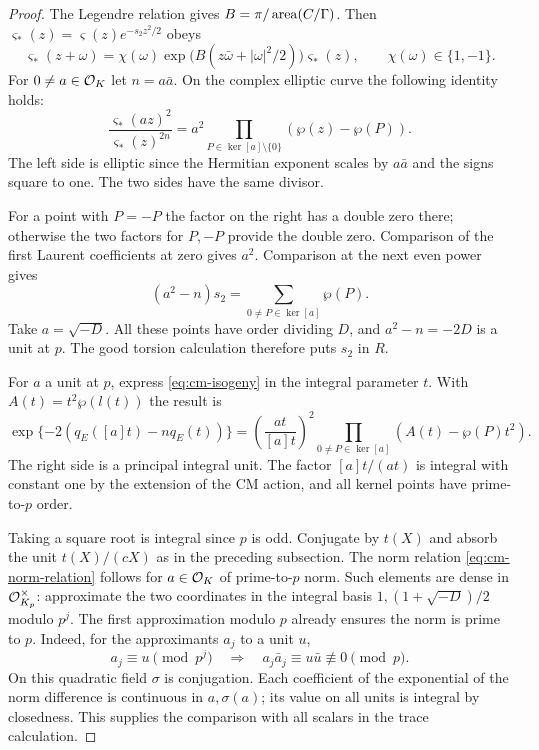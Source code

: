 \begin{proof}

The Legendre relation gives
\(B=\pi/\operatorname{area}(C/\Gamma)\).
Then \(\varsigma_*(z)=\varsigma(z)e^{-s_2z^2/2}\) obeys
\[
 \varsigma_*(z+\omega)=\chi(\omega)
         \exp\big(B(z\bar\omega+|\omega|^2/2)\big)
         \varsigma_*(z),\qquad \chi(\omega)\in\{1,-1\}.
\]
For \(0\ne a\in{\cal O}_K\) let \(n=a\bar a\). On the complex
elliptic curve the following identity holds:
\begin{equation}\label{eq:cm-isogeny}
 \frac{\varsigma_*(az)^2}{\varsigma_*(z)^{2n}}
       =a^2\prod_{P\in\ker[a]\setminus\{0\}}
                                      (\wp(z)-\wp(P)).
\end{equation}
The left side is elliptic since the Hermitian exponent scales
by \(a\bar a\) and the signs square to one. The two sides have
the same divisor.

For a point with \(P=-P\) the factor on the
right has a double zero there; otherwise the two factors for
\(P,-P\) provide the double zero. Comparison of the first
Laurent coefficients at zero gives \(a^2\). Comparison at
the next even power gives
\[
                 (a^2-n)s_2=\sum_{0\ne P\in\ker[a]}\wp(P).
\]
Take \(a=\sqrt{-D}\). All these points have order dividing
\(D\), and \(a^2-n=-2D\) is a unit at \(p\). The good torsion
calculation therefore puts \(s_2\) in \(R\).


For \(a\) a unit at \(p\), express \eqref{eq:cm-isogeny} in
the integral parameter \(t\). With \(A(t)=t^2\wp(l(t))\)
the result is
\[
 \exp\{-2(q_E([a]t)-nq_E(t))\}
  =\left(\frac{a t}{[a]t}\right)^2
                   \prod_{0\ne P\in\ker[a]}(A(t)-\wp(P)t^2).
\]
The right side is a principal integral unit. The factor
\([a]t/(a t)\) is integral with constant one by the extension
of the CM action, and all kernel points have prime-to-\(p\)
order.

Taking a square root is integral since \(p\) is odd.
Conjugate by \(t(X)\) and absorb the unit \(t(X)/(cX)\) as
in the preceding subsection. The norm relation
\eqref{eq:cm-norm-relation} follows for \(a\in{\cal O}_K\)
of prime-to-\(p\) norm. Such elements are dense in
\({\cal O}_{K_p}^\times\): approximate the two coordinates
in the integral basis \(1,(1+\sqrt{-D})/2\) modulo \(p^j\).
The first approximation modulo \(p\) already ensures the
norm is prime to \(p\).
Indeed, for the approximants \(a_j\) to a unit \(u\),
\[
  a_j\equiv u\pmod {p^j}\quad\Longrightarrow\quad a_j\bar a_j\equiv u\bar u\not\equiv0\pmod p .
\]
 On this quadratic field \(\sigma\)
is conjugation. Each coefficient of the exponential of the
norm difference is continuous in \(a,\sigma(a)\); its value
on all units is integral by closedness. This supplies the
comparison with all scalars in the trace calculation.

\end{proof}

